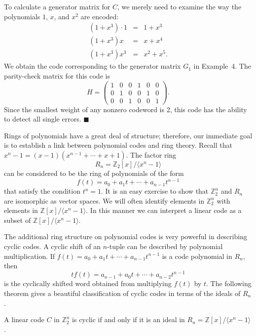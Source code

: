 To calculate a generator matrix for $C$, we merely need to examine the way the polynomials $1$, $x$, and $x^2$ are encoded:
\begin{eqnarray*}
(1 + x^3) \cdot 1 & = & 1 + x^3 \\
(1 + x^3)x & = & x + x^4 \\
(1 + x^3)x^3 & = & x^2 + x^5. 
\end{eqnarray*}
We obtain the code corresponding to the generator matrix $G_1$ in Example~4.  The parity-check matrix for this code is
$$
H
= 
\left(
\begin{array}{cccccc}
1 & 0 & 0 & 1 & 0 & 0 \\
0 & 1 & 0 & 0 & 1 & 0 \\
0 & 0 & 1 & 0 & 0 & 1 
\end{array}
\right).
$$
Since the smallest weight of any nonzero codeword is 2, this code has the ability to detect all single errors.  
\hspace{\fill} $\blacksquare$

\medskip
 
Rings of polynomials have a great deal of structure; therefore, our immediate goal is to establish a link between polynomial codes and ring theory. Recall that $x^n - 1 = (x - 1)( x^{n-1} + \cdots + x + 1)$.  The factor ring 
$$
R_n = {\mathbb Z}_2[x]/ \langle x^n - 1 \rangle
$$ 
can be considered to be the ring of polynomials of the form 
$$
f(t) = a_0 + a_1 t + \cdots + a_{n-1} t^{n-1}
$$
that satisfy the condition $t^n = 1$.  It is an easy exercise to show that ${\mathbb Z}_2^n$ and $R_n$ are isomorphic as vector spaces.  We will often identify elements in ${\mathbb Z}_2^n$ with elements in
${\mathbb Z}[x] / \langle x^n - 1 \rangle$.  In this manner we can interpret a linear code as a subset of ${\mathbb Z}[x] / \langle x^n - 1 \rangle$.  

The additional ring structure on polynomial codes is very powerful in describing cyclic codes. A cyclic shift of an $n$-tuple can be described by polynomial multiplication.  If $f(t) = a_0 + a_1 t + \cdots + a_{n-1} t^{n-1}$ is a code polynomial in $R_n$, then
$$
tf(t) = a_{n-1} + a_0 t + \cdots + a_{n-2} t^{n-1}
$$
is the cyclically shifted word obtained from multiplying $f(t)$ by $t$.  The following theorem gives a beautiful classification of cyclic codes in terms of the ideals of $R_n$.

\begin{theorem} 
A linear code $C$ in ${\mathbb Z}_2^n$ is cyclic if and only if it is an ideal in $R_n = {\mathbb Z}[x] / \langle x^n - 1 \rangle$. 
\end{theorem}
 
